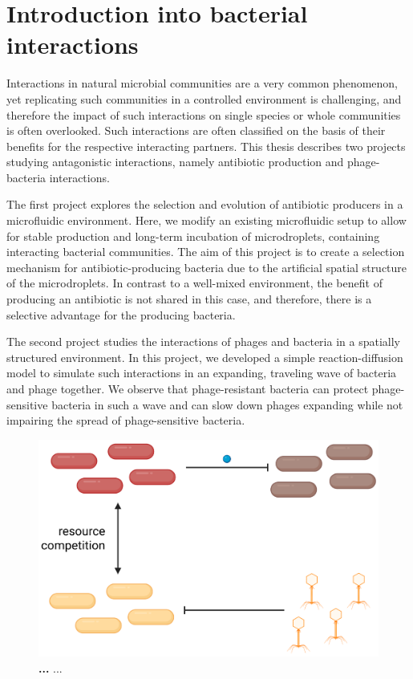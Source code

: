 \chapter{Introduction into bacterial interactions}
Interactions in natural microbial communities are a very common phenomenon, yet replicating such communities in a controlled environment is challenging, and therefore the impact of such interactions on single species or whole communities is often overlooked. Such interactions are often classified on the basis of their benefits for the respective interacting partners. This thesis describes two projects studying antagonistic interactions, namely antibiotic production and phage-bacteria interactions. 

The first project explores the selection and evolution of antibiotic producers in a microfluidic environment. Here, we modify an existing microfluidic setup to allow for stable production and long-term incubation of microdroplets, containing interacting bacterial communities. The aim of this project is to create a selection mechanism for antibiotic-producing bacteria due to the artificial spatial structure of the microdroplets. In contrast to a well-mixed environment, the benefit of producing an antibiotic is not shared in this case, and therefore, there is a selective advantage for the producing bacteria. 

The second project studies the interactions of phages and bacteria in a spatially structured environment. In this project, we developed a simple reaction-diffusion model to simulate such interactions in an expanding, traveling wave of bacteria and phage together. We observe that phage-resistant bacteria can protect phage-sensitive bacteria in such a wave and can slow down phages expanding while not impairing the spread of phage-sensitive bacteria.

\begin{figure}
\includegraphics[width=\linewidth]{graphics/2025_09_28_intro_fig1.png}

\caption{\textbf{...} ...}
\label{fig:intro_shared_interactions}
\end{figure}